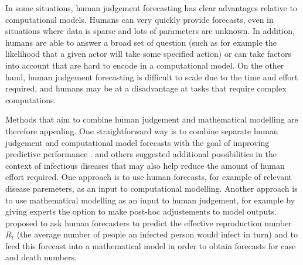 \documentclass[10pt,a4paper,twocolumn]{article}
\begin{document}
In some situations, human judgement forecasting has clear advantages relative to computational models. Humans can very quickly provide forecasts, even in situations where data is sparse and lots of parameters are unknown. In addition, humans are able to answer a broad set of question (such as for example the likelihood that a given actor will take some specified action) or can take factors into account that are hard to encode in a computational model. On the other hand, human judgement forecasting is difficult to scale due to the time and effort required, and humans may be at a disadvantage at tasks that require complex computations. 



Methods that aim to combine human judgement and mathematical modelling are therefore appealing. One straightforward way is to combine separate human judgement and computational model forecasts with the goal of improving predictive performance \citep{mcandrewChimericForecastingCombining2022}. \cite{farrowHumanJudgmentApproach2017, bosseComparingHumanModelbased2022} and others suggested additional possibilities in the context of infectious diseases that may also help reduce the amount of human effort required. One approach is to use human forecasts, for example of relevant disease paremeters, as an input to computational modelling. Another approach is to use mathematical modelling as an input to human judgement, for example by giving experts the option to make post-hoc adjustements to model outputs. \citet{bosseComparingHumanModelbased2022} proposed to ask human forecasters to predict the effective reproduction number $R_t$ (the average number of people an infected person would infect in turn) and to feed this forecast into a mathematical model in order to obtain forecasts for case and death numbers. 
\end{document}
